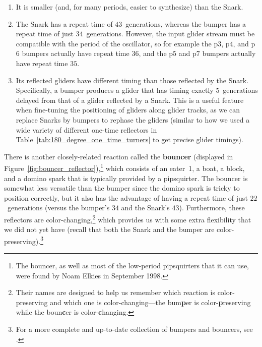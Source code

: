 \begin{enumerate}
	\item[1)] It is smaller (and, for many periods, easier to synthesize) than the Snark.\smallskip
	
	\item[2)] The Snark has a repeat time of $43$~generations, whereas the bumper has a repeat time of just $34$~generations. However, the input glider stream must be compatible with the period of the oscillator, so for example the p$3$, p$4$, and p$6$ bumpers actually have repeat time $36$, and the p$5$ and p$7$ bumpers actually have repeat time $35$.\smallskip
	
	\item[3)] Its reflected gliders have different timing than those reflected by the Snark. Specifically, a bumper produces a glider that has timing exactly $5$~generations delayed from that of a glider reflected by a Snark. This is a useful feature when fine-tuning the positioning of gliders along glider tracks, as we can replace Snarks by bumpers to rephase the gliders (similar to how we used a wide variety of different one-time reflectors in Table~\ref{tab:180_degree_one_time_turners} to get precise glider timings).\smallskip
\end{enumerate}

There is another closely-related reaction called the \textbf{bouncer} (displayed in Figure~\ref{fig:bouncer_reflector}),\footnote{The bouncer, as well as most of the low-period pipsquirters that it can use, were found by Noam Elkies in September 1998.} which consists of an eater~1, a boat, a block, and a domino spark that is typically provided by a pipsquirter. The bouncer is somewhat less versatile than the bumper since the domino spark is tricky to position correctly, but it also has the advantage of having a repeat time of just $22$~generations (versus the bumper's $34$ and the Snark's $43$). Furthermore, these reflectors are color-changing,\footnote{Their names are designed to help us remember which reaction is color-preserving and which one is color-changing---the bum\textbf{p}er is color-\textbf{p}reserving while the boun\textbf{c}er is color-\textbf{c}hanging.} which provides us with some extra flexibility that we did not yet have (recall that both the Snark and the bumper are color-preserving).\footnote{For a more complete and up-to-date collection of bumpers and bouncers, see .}

